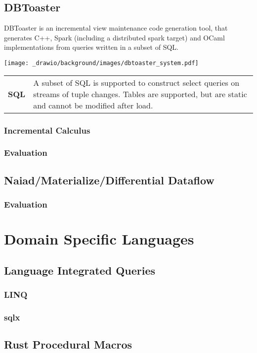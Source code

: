 \subsection{DBToaster}
DBToaster is an incremental view maintenance code generation tool, that generates C++, Spark (including a distributed spark target) and OCaml implementations from queries written in a subset of SQL.
\begin{center}
    \texttt{[image: \_drawio/background/images/dbtoaster\_system.pdf]}
\end{center}
\begin{center}
    \begin{tabular}{l p{}}
        \textbf{SQL} & {
                A subset of SQL is supported to construct select queries on streams\cite{DBToasterSQLReference} of tuple changes.
                Tables are supported, but are static and cannot be modified after load.
            }
        \\
    \end{tabular}
\end{center}
\subsubsection{Incremental Calculus}
\subsubsection{Evaluation}

\subsection{Naiad/Materialize/Differential Dataflow}
\subsubsection{Evaluation}

\section{Domain Specific Languages}
\subsection{Language Integrated Queries}
\subsubsection{LINQ}

\subsubsection{sqlx}

\subsection{Rust Procedural Macros}

